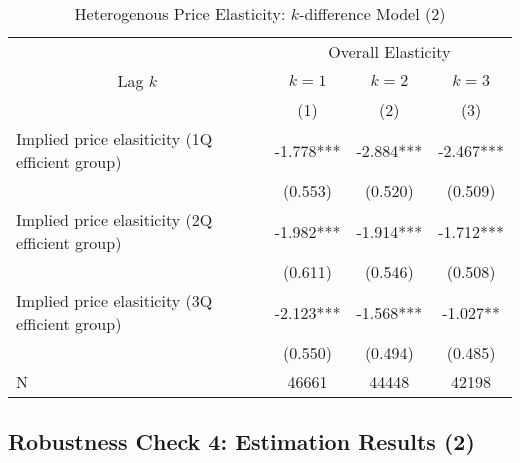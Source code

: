 \documentclass[ review  , 3p ]{elsarticle}
\begin{document}
  \begin{table}

  \caption{\label{tab:kableHeterokDiffElasticitySlide2}Heterogenous Price Elasticity: $k$-difference Model (2)}
  \centering
  \fontsize{8}{10}\selectfont
  \begin{tabular}[t]{lccc}
  \toprule
  \multicolumn{1}{c}{ } & \multicolumn{3}{c}{Overall Elasticity} \\
  \cmidrule(l{3pt}r{3pt}){2-4}
  \multicolumn{1}{c}{Lag $k$} & \multicolumn{1}{c}{$k = 1$} & \multicolumn{1}{c}{$k = 2$} & \multicolumn{1}{c}{$k = 3$} \\
  \cmidrule(l{3pt}r{3pt}){1-1} \cmidrule(l{3pt}r{3pt}){2-2} \cmidrule(l{3pt}r{3pt}){3-3} \cmidrule(l{3pt}r{3pt}){4-4}
   & (1) & (2) & (3)\\
  \midrule
  Implied price elasiticity (1Q efficient group) & -1.778*** & -2.884*** & -2.467***\\
   & (0.553) & (0.520) & (0.509)\\
  Implied price elasiticity (2Q efficient group) & -1.982*** & -1.914*** & -1.712***\\
   & (0.611) & (0.546) & (0.508)\\
  Implied price elasiticity (3Q efficient group) & -2.123*** & -1.568*** & -1.027**\\
   & (0.550) & (0.494) & (0.485)\\
  N & 46661 & 44448 & 42198\\
  \bottomrule
  \end{tabular}
  \end{table}

  \hypertarget{robustness-check-4-estimation-results-2}{%
  \subsection{Robustness Check 4: Estimation Results (2)}\label{robustness-check-4-estimation-results-2}}
\end{document}
